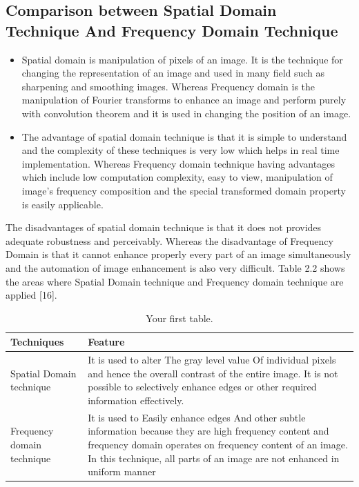 \subsection{Comparison between Spatial Domain Technique And Frequency Domain Technique}
\begin{itemize}
	\item Spatial domain is manipulation of pixels of an image. It is the technique for changing the representation of an image and used in many field such as sharpening and smoothing images. Whereas Frequency domain is the manipulation of Fourier transforms to enhance an image and perform purely with convolution theorem and it is used in changing the position of an image. 
	\item The advantage of spatial domain technique is that it is simple to understand and the complexity of these techniques is very low which helps in real time implementation. Whereas Frequency domain technique having advantages which include low computation complexity, easy to view, manipulation of image’s frequency composition and the special transformed domain property is easily applicable.
	
\end{itemize}

The disadvantages of spatial domain technique is that it does not provides adequate robustness and perceivably. Whereas the disadvantage of Frequency Domain is that it cannot enhance properly every part of an image simultaneously and the automation of image enhancement is also very difficult. Table 2.2 shows the areas where Spatial Domain technique and Frequency domain technique are applied [16].

\begin{table}[h!]
	\begin{center}
	\caption{Your first table.}
    \label{tab:table1}
	\begin{tabular}{| m{5cm} | m{8cm}| }
	\hline
		\textbf{Techniques} & \textbf{Feature}\\
	\hline
		Spatial Domain technique & It is used to alter The gray level value Of individual pixels and hence the overall contrast of the entire image. It is not possible to selectively enhance edges or other required information effectively. \\
	\hline
		Frequency domain technique & It is used to Easily enhance edges And other subtle information because they are high frequency content and frequency domain operates on frequency content of an image. In this technique, all parts of  an  image  are  not enhanced in uniform manner \\ 
	
	\hline
	\end{tabular}
	\end{center}

\end{table}


